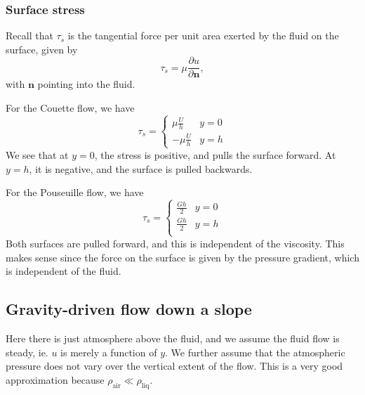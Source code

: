 \documentclass[a4paper]{article}
\begin{document}
\subsubsection{Surface stress}
Recall that $\tau_s$ is the tangential force per unit area exerted by the fluid on the surface, given by
\[
  \tau_s = \mu \frac{\partial u}{\partial \mathbf{n}},
\]
with $\mathbf{n}$ pointing into the fluid.

\begin{eg}
For the Couette flow, we have
\[
  \tau_s =
  \begin{cases}
    \mu \frac{U}{h} & y = 0\\
    -\mu \frac{U}{h} & y = h
  \end{cases}
\]
We see that at $y = 0$, the stress is positive, and pulls the surface forward. At $y = h$, it is negative, and the surface is pulled backwards.

For the Pouseuille flow, we have
\[
  \tau_s =
  \begin{cases}
    \frac{Gh}{2} & y = 0\\
    \frac{Gh}{2} & y = h\\
  \end{cases}
\]
Both surfaces are pulled forward, and this is independent of the viscosity. This makes sense since the force on the surface is given by the pressure gradient, which is independent of the fluid.
\end{eg}
\subsection{Gravity-driven flow down a slope}
\begin{center}
\end{center}
Here there is just atmosphere above the fluid, and we assume the fluid flow is steady, ie. $u$ is merely a function of $y$. We further assume that the atmospheric pressure does not vary over the vertical extent of the flow. This is a very good approximation because $\rho_{\mathrm{air}} \ll \rho_{\mathrm{liq}}$.
\end{document}
